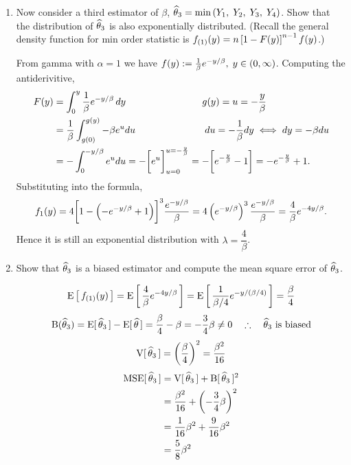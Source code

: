 \begin{enumerate}[label=(\alph*)]
    \item Now consider a third estimator of $\beta$, $\that_3 = \min \pars{Y_1, \; Y_2, \; Y_3, \; Y_4}$. Show that the distribution of $\that_3$ is also exponentially distributed. (Recall the general density function for min order statistic is $f_{(1)}(y) = n \brac{1-F(y)}^{n-1}f(y)$.)
    \begin{mybox}
        From gamma with $\alpha = 1$ we have $f(y) := \over{\beta}e^{-y/\beta},\;y\in(0,\infty)$. Computing the antiderivitive, 
    \begin{align*}
        F(y) &= \int_0^y \frac{1}{\beta}e^{-y/\beta}\,dy \hspace{1.1in} g(y) = u = -\frac{y}{\beta}\\
        &= \over{\beta} \int_{g(0)}^{g(y)} -\beta e^u du \hspace{1in} du = -\over{\beta}dy \iff dy = -\beta du\\
        &= - \int_0^{-y/\beta} e^u du = -\bbrac{e^u}_{u=0}^{u=-\frac{y}{\beta}} = - \bbrac{e^{-\frac{y}{\beta}} - 1} = -e^{-\frac{y}{\beta}} + 1.
    \end{align*}
    Substituting into the formula, 
    $$f_1(y) = 4\bbrac{1- \pars{-e^{-y/\beta} + 1}}^{3} \frac{e^{-y/\beta}}{\beta} = 4\pars{e^{-y/\beta}}^3 \frac{e^{-y/\beta}}{\beta} = \frac{4}{\beta}e^{-4y/\beta}.$$
    Hence it is still an exponential distribution with $\lambda = \dfrac{4}{\beta}$.
\end{mybox}
\vspace{.5in}
    \item Show that $\that_3$ is a biased estimator and compute the mean square error of $\that_3$.
\begin{mybox}
    $$\Eb{f_{(1)}(y)} = \Eb{ \frac{4}{\beta}e^{-4y/\beta}} = \Eb{\frac{1}{\beta/4}e^{-y/(\beta/4)}} = \frac{\beta}{4}$$
    $$\operatorname{B}(\that_3) = \Es{\that_3} - \Es{\that} = \frac{\beta}{4} - \beta = -\frac{3}{4}\beta \neq 0 \quad \therefore \quad \that_3 \text{ is biased}$$
    $$\Vs{\that_3} = \pfrac{\beta}{4}^2 = \frac{\beta^2}{16}$$
    \begin{align*}
        \operatorname{MSE}[\,\that_3\,] &= \Vs{\that_3}+ \operatorname{B}[\,\that_3\,]^2\\
        &= \frac{\beta^2}{16} + \pars{-\frac{3}{4}\beta}^2 \\ 
        &= \frac{1}{16}\beta^2 + \frac{9}{16} \beta^2\\
        &= \frac{5}{8}\beta^2
    \end{align*}
\end{mybox}
\end{enumerate} 